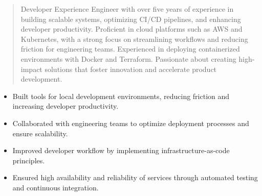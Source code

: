 



\makecvheader

\begin{quote}
  \noindent
  Developer Experience Engineer with over five years of experience in building scalable systems, optimizing CI/CD pipelines, and enhancing developer productivity. Proficient in cloud platforms such as AWS and Kubernetes, with a strong focus on streamlining workflows and reducing friction for engineering teams. Experienced in deploying containerized environments with Docker and Terraform. Passionate about creating high-impact solutions that foster innovation and accelerate product development.
\end{quote}

\par\smallskip
\noindent
\begin{minipage}{20cm}
  \begin{minipage}{9.75cm}
    \begin{itemize}
      \item Built tools for local development environments, reducing friction and increasing developer productivity.
      \item Collaborated with engineering teams to optimize deployment processes and ensure scalability.
    \end{itemize}
  \end{minipage}
  \hfill
  \begin{minipage}{9.75cm}
    \begin{itemize}
      \item Improved developer workflow by implementing infrastructure-as-code principles.
      \item Ensured high availability and reliability of services through automated testing and continuous integration.
    \end{itemize}
  \end{minipage}
\end{minipage}
\par\smallskip
\divider

